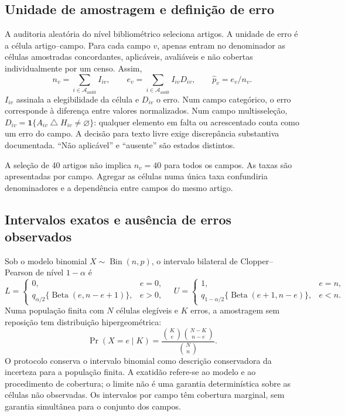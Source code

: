 \subsection{Unidade de amostragem e definição de erro}
\label{sec:mat-auditoria-amostra}
A auditoria aleatória do nível bibliométrico seleciona artigos. A unidade de erro é a célula artigo--campo. Para cada campo $v$, apenas entram no denominador as células amostradas concordantes, aplicáveis, avaliáveis e não cobertas individualmente por um censo. Assim,
\begin{equation}
n_v=\sum_{i\in\mathcal A_{\mathrm{audit}}}I_{iv},
\qquad e_v=\sum_{i\in\mathcal A_{\mathrm{audit}}}I_{iv}D_{iv},
\qquad \widehat p_v=e_v/n_v.
\label{eq:mat-erro-auditoria}
\end{equation}
$I_{iv}$ assinala a elegibilidade da célula e $D_{iv}$ o erro. Num campo categórico, o erro corresponde à diferença entre valores normalizados. Num campo multisseleção, $D_{iv}=\mathbf1\{A_{iv}\mathbin\triangle H_{iv}\neq\varnothing\}$: qualquer elemento em falta ou acrescentado conta como um erro do campo. A decisão para texto livre exige discrepância substantiva documentada. ``Não aplicável'' e ``ausente'' são estados distintos.

A seleção de 40 artigos não implica $n_v=40$ para todos os campos. As taxas são apresentadas por campo. Agregar as células numa única taxa confundiria denominadores e a dependência entre campos do mesmo artigo.

\subsection{Intervalos exatos e ausência de erros observados}
\label{sec:mat-clopper-pearson}
Sob o modelo binomial $X\sim\operatorname{Bin}(n,p)$, o intervalo bilateral de Clopper--Pearson de nível $1-\alpha$ é~\parencite{ClopperPearson1934}
\begin{equation}
L=\begin{cases}0,&e=0,\\q_{\alpha/2}\{\operatorname{Beta}(e,n-e+1)\},&e>0,\end{cases}
\quad
U=\begin{cases}1,&e=n,\\q_{1-\alpha/2}\{\operatorname{Beta}(e+1,n-e)\},&e<n.\end{cases}
\label{eq:mat-cp}
\end{equation}
Numa população finita com $N$ células elegíveis e $K$ erros, a amostragem sem reposição tem distribuição hipergeométrica:
\begin{equation}
\Pr(X=e\mid K)=\frac{\binom Ke\binom{N-K}{n-e}}{\binom Nn}.
\label{eq:mat-hipergeometrica}
\end{equation}
O protocolo conserva o intervalo binomial como descrição conservadora da incerteza para a população finita. A exatidão refere-se ao modelo e ao procedimento de cobertura; o limite não é uma garantia determinística sobre as células não observadas. Os intervalos por campo têm cobertura marginal, sem garantia simultânea para o conjunto dos campos.

